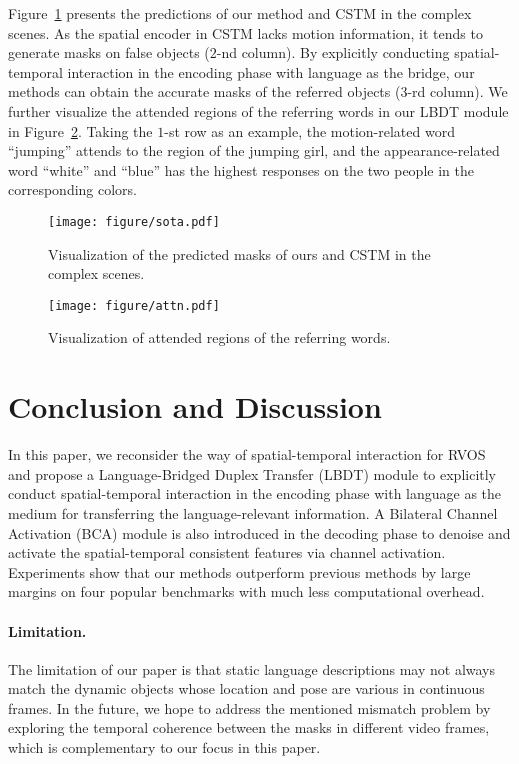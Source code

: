 \documentclass[10pt,twocolumn,letterpaper]{article}
\begin{document}
Figure~\ref{fig:sota} presents the predictions of our method and CSTM \cite{HuiH0DLWH021} in the complex scenes. As the spatial encoder in CSTM lacks motion information, it tends to generate masks on false objects ($2$-nd column). By explicitly conducting spatial-temporal interaction in the encoding phase with language as the bridge, our methods can obtain the accurate masks of the referred objects ($3$-rd column).
We further visualize the attended regions of the referring words in our LBDT module in Figure~\ref{fig:attn}. Taking the $1$-st row as an example, the motion-related word ``jumping'' attends to the region of the jumping girl, and the appearance-related word ``white'' and ``blue'' has the highest responses on the two people in the corresponding colors. 

\begin{figure}[t]
	\centering
		\texttt{[image: figure/sota.pdf]}
	\caption{Visualization of the predicted masks of ours and CSTM \cite{HuiH0DLWH021} in the complex scenes.}
    
	\label{fig:sota}
	
\end{figure}

\begin{figure}[t]
	\centering
		\texttt{[image: figure/attn.pdf]}
	\caption{Visualization of attended regions of the referring words.}

	\label{fig:attn}
	
\end{figure}



\section{Conclusion and Discussion}
\label{sec:conclu}

In this paper, we reconsider the way of spatial-temporal interaction for RVOS and propose a Language-Bridged Duplex Transfer (LBDT) module to explicitly conduct spatial-temporal interaction in the encoding phase with language as the medium for transferring the language-relevant information. A Bilateral Channel Activation (BCA) module is also introduced in the decoding phase to denoise and activate the spatial-temporal consistent features via channel activation. Experiments show that our methods outperform previous methods by large margins on four popular benchmarks with much less computational overhead.

\paragraph{Limitation.} The limitation of our paper is that static language descriptions may not always match the dynamic objects whose location and pose are various in continuous frames. In the future, we hope to address the mentioned mismatch problem by exploring the temporal coherence between the masks in different video frames, which is complementary to our focus
in this paper.
\end{document}
